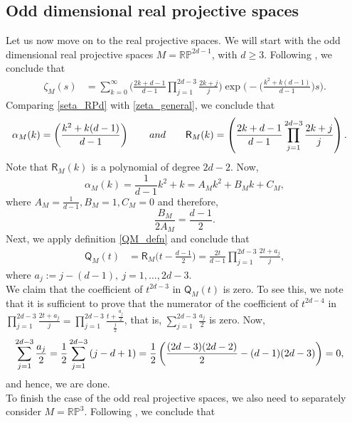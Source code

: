 \documentclass[11pt,lettersize,reqno,fullpage]{amsart}
\providecommand \hf{\hspace*{0.5cm}}
\begin{document}
\subsection{Odd dimensional real projective spaces}
Let us now move on to the real projective spaces. 
We will start with the odd dimensional real projective spaces 
$M=\mathbb{RP}^{2d-1}$, with $d \geq 3$. 
Following \cite[page 8, corollary 2.6]{Cahn}, we conclude that 
\begin{align}
\zeta_{M}(s) & = \sum_{k=0}^{\infty} \Big(\frac{2k+d-1}{d-1}\prod_{j=1}^{2d-3} \frac{2k+j}{j}\Big) 
\exp\Big(-\Big(\frac{k^2+k(d-1)}{d-1}\Big)s\Big). \label{seta_RPd}
\end{align}
Comparing \eqref{seta_RPd} with \eqref{zeta_general}, we conclude that 
\begin{align}
\alpha_{M}(k)& = \left(\frac{k^2+k(d-1)}{d-1}\right) \qquad \textnormal{and} \qquad 
\mathsf{R}_{M}(k) = 
\left(\frac{2k+d-1}{d-1}\prod_{j=1}^{2d-3} \frac{2k+j}{j}\right).
\end{align}
Note that $\mathsf{R}_{M}(k)$ is a polynomial of degree $2d-2$.  Now, 
\[\alpha_{M}(k)=\frac{1}{d-1}k^{2}+k=A_{M}k^{2}+B_{M}k+C_{M}, \]
where $A_{M}=\frac{1}{d-1}, B_{M}=1, C_{M}=0 $ and therefore, 
\[\frac{B_{M}}{2 A_{M}}=\frac{d-1}{2}. \] 
Next, we apply definition \eqref{QM_defn} and conclude that 
\begin{align}
\mathsf{Q}_{M}(t) & = \mathsf{R}_{M}\Big(t-\frac{d-1}{2}\Big)=\frac{2t}{d-1} \prod_{j=1}^{2d-3}  \frac{2t+a_{j}}{j},
\end{align}
where $a_{j}:=j-(d-1),\ j=1,\dots,2d-3$. \\
\hf \hf We claim that the coefficient of $t^{2d-3} $ in $\mathsf{Q}_{M}(t)$ is zero. To see this, 
we note that it is sufficient to prove that the numerator of the coefficient of 
$t^{2d-4} $ in $ \prod_{j=1}^{2d-3} \frac{2t+a_{j}}{j}=\prod_{j=1}^{2d-3} \frac{t+\frac{a_{j}}{2}}{\frac{j}{2}} $, that is, $\sum_{j=1}^{2d-3} \frac{a_{j}}{2} $ is zero. Now,
\begin{equation}
\begin{aligned}
\sum_{j=1}^{2d-3} \frac{a_{j}}{2}&=\frac{1}{2}\sum_{j=1}^{2d-3} \left(j-d+1 \right)=\frac{1}{2} \left(\frac{(2d-3)(2d-2)}{2}-(d-1)(2d-3) \right)=0,
\end{aligned}
\notag
\end{equation}
and hence, we are done. \\ 
\hf \hf To finish the case of the odd real projective spaces, 
we also need to separately consider $M=\mathbb{RP}^3$. 
Following 
\cite[page 6, equation 2.3 (b)]{Cahn}, we conclude that 
\end{document}
